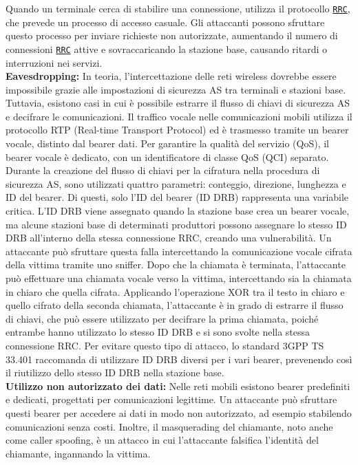 \documentclass[english]{article}
\begin{document}
Quando un terminale cerca di stabilire una connessione, utilizza il protocollo \texttt{\hyperlink{RRC}{RRC}},
che prevede un processo di accesso casuale. Gli attaccanti possono sfruttare questo
processo per inviare richieste non autorizzate, aumentando il numero di connessioni
\texttt{\hyperlink{RRC}{RRC}} attive e sovraccaricando la stazione base, causando ritardi o interruzioni nei servizi.
\\[0.2cm]
\textbf{Eavesdropping:} In teoria, l'intercettazione delle reti wireless dovrebbe essere impossibile
grazie alle impostazioni di sicurezza AS tra terminali e stazioni base. Tuttavia, esistono casi in
cui è possibile estrarre il flusso di chiavi di sicurezza AS e decifrare le comunicazioni.
Il traffico vocale nelle comunicazioni mobili utilizza il protocollo RTP (Real-time Transport Protocol)
ed è trasmesso tramite un bearer vocale, distinto dal bearer dati. Per garantire la qualità del servizio
(QoS), il bearer vocale è dedicato, con un identificatore di classe QoS (QCI) separato.
Durante la creazione del flusso di chiavi per la cifratura nella procedura di sicurezza AS,
sono utilizzati quattro parametri: conteggio, direzione, lunghezza e ID del bearer.
Di questi, solo l'ID del bearer (ID DRB) rappresenta una variabile critica.
L'ID DRB viene assegnato quando la stazione base crea un bearer vocale,
ma alcune stazioni base di determinati produttori possono assegnare lo stesso ID DRB
all'interno della stessa connessione RRC, creando una vulnerabilità.
Un attaccante può sfruttare questa falla intercettando la comunicazione vocale
cifrata della vittima tramite uno sniffer. Dopo che la chiamata è terminata,
l'attaccante può effettuare una chiamata vocale verso la vittima, intercettando sia la chiamata
in chiaro che quella cifrata. Applicando l'operazione XOR tra il testo in chiaro e quello cifrato
della seconda chiamata, l'attaccante è in grado di estrarre il flusso di chiavi,
che può essere utilizzato per decifrare la prima chiamata, poiché entrambe hanno utilizzato
lo stesso ID DRB e si sono svolte nella stessa connessione RRC. Per evitare questo tipo di attacco,
lo standard 3GPP TS 33.401 raccomanda di utilizzare ID DRB diversi per i vari bearer,
prevenendo così il riutilizzo dello stesso ID DRB nella stazione base.
\\[0.2cm]
\textbf{Utilizzo non autorizzato dei dati:} Nelle reti mobili esistono bearer predefiniti
e dedicati, progettati per comunicazioni legittime. Un attaccante può sfruttare questi
bearer per accedere ai dati in modo non autorizzato, ad esempio stabilendo
comunicazioni senza costi. Inoltre, il masquerading del chiamante,
noto anche come caller spoofing, è un attacco in cui l'attaccante falsifica l'identità
del chiamante, ingannando la vittima.
\end{document}
